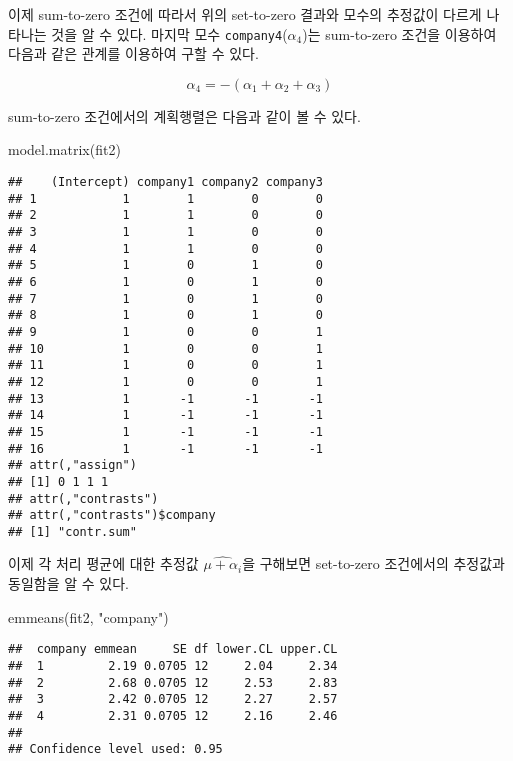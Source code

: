 \documentclass[
]{book}
\newenvironment{Shaded}{\begin{snugshade}}{\end{snugshade}}
\newcommand{\FunctionTok}[1]{\textcolor[rgb]{0.00,0.00,0.00}{#1}}
\newcommand{\NormalTok}[1]{#1}
\newcommand{\StringTok}[1]{\textcolor[rgb]{0.31,0.60,0.02}{#1}}
\begin{document}
이제 sum-to-zero 조건에 따라서 위의 set-to-zero 결과와 모수의 추정값이
다르게 나타나는 것을 알 수 있다. 마지막 모수 \texttt{company4}(\(\alpha_4\))는
sum-to-zero 조건을 이용하여 다음과 같은 관계를 이용하여 구할 수 있다.

\[  \alpha_4 = -(\alpha_1 + \alpha_2 + \alpha_3) \]

sum-to-zero 조건에서의 계획행렬은 다음과 같이 볼 수 있다.

\begin{Shaded}
\begin{Highlighting}[]
\FunctionTok{model.matrix}\NormalTok{(fit2)}
\end{Highlighting}
\end{Shaded}

\begin{verbatim}
##    (Intercept) company1 company2 company3
## 1            1        1        0        0
## 2            1        1        0        0
## 3            1        1        0        0
## 4            1        1        0        0
## 5            1        0        1        0
## 6            1        0        1        0
## 7            1        0        1        0
## 8            1        0        1        0
## 9            1        0        0        1
## 10           1        0        0        1
## 11           1        0        0        1
## 12           1        0        0        1
## 13           1       -1       -1       -1
## 14           1       -1       -1       -1
## 15           1       -1       -1       -1
## 16           1       -1       -1       -1
## attr(,"assign")
## [1] 0 1 1 1
## attr(,"contrasts")
## attr(,"contrasts")$company
## [1] "contr.sum"
\end{verbatim}

이제 각 처리 평균에 대한 추정값 \(\widehat{\mu+ \alpha_i}\)을 구해보면 set-to-zero 조건에서의 추정값과 동일함을 알 수 있다.

\begin{Shaded}
\begin{Highlighting}[]
\FunctionTok{emmeans}\NormalTok{(fit2, }\StringTok{"company"}\NormalTok{)}
\end{Highlighting}
\end{Shaded}

\begin{verbatim}
##  company emmean     SE df lower.CL upper.CL
##  1         2.19 0.0705 12     2.04     2.34
##  2         2.68 0.0705 12     2.53     2.83
##  3         2.42 0.0705 12     2.27     2.57
##  4         2.31 0.0705 12     2.16     2.46
## 
## Confidence level used: 0.95
\end{verbatim}
\end{document}
